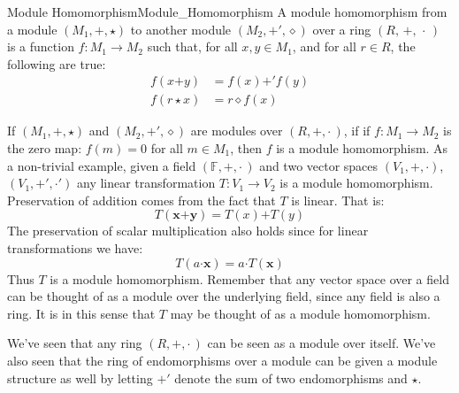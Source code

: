     \begin{fdefinition}{Module Homomorphism}{Module_Homomorphism}
        A \gls{module homomorphism} from a
        \gls{module} $(M_{1},\boldsymbol{+},\star)$ to another module
        $(M_{2},\boldsymbol{+}',\diamond)$ over a \gls{ring}
        $(R,\,+,\,\cdot\,)$ is a \gls{function} $f:M_{1}\rightarrow{M}_{2}$
        such that, for all $x,y\in{M}_{1}$, and for all $r\in{R}$, the
        following are true:
        \begin{align}
            f(x\boldsymbol{+}y)&=f(x)\boldsymbol{+}'f(y)
            \tag{Preservation of Addition}\\
            f(r\star{x})&=r\diamond{f}(x)
            \tag{Preservation of Scalar Multiplication}
        \end{align}
    \end{fdefinition}
    \begin{example}
        If $(M_{1},\boldsymbol{+},\star)$ and $(M_{2},\boldsymbol{+}',\diamond)$
        are modules over $(R,+,\cdot\,)$, if if $f:M_{1}\rightarrow{M}_{2}$ is
        the zero map: $f(m)=0$ for all $m\in{M}_{1}$, then $f$ is a module
        homomorphism. As a non-trivial example, given a field
        $(\mathbb{F},+,\cdot\,)$ and two vector spaces
        $(V_{1},\boldsymbol{+},\boldsymbol{\cdot})$,
        $(V_{1},\boldsymbol{+}',\boldsymbol{\cdot}')$ any linear transformation
        $T:V_{1}\rightarrow{V}_{2}$ is a module homomorphism. Preservation of
        addition comes from the fact that $T$ is linear. That is:
        \begin{equation}
            T(\mathbf{x}\boldsymbol{+}\mathbf{y})
            =T(x)\boldsymbol{+}T(y)
        \end{equation}
        The preservation of scalar multiplication also holds since for linear
        transformations we have:
        \begin{equation}
            T(a\boldsymbol{\cdot}\mathbf{x})
            =a\boldsymbol{\cdot}{T}(\mathbf{x})
        \end{equation}
        Thus $T$ is a module homomorphism. Remember that any vector space over
        a field can be thought of as a module over the underlying field, since
        any field is also a ring. It is in this sense that $T$ may be thought of
        as a module homomorphism.
    \end{example}
    \begin{example}
        We've seen that any ring $(R,+,\cdot\,)$ can be seen as a module over
        itself. We've also seen that the ring of endomorphisms over a module
        can be given a module structure as well by letting $\boldsymbol{+}'$
        denote the sum of two endomorphisms and $\star$.
    \end{example}
